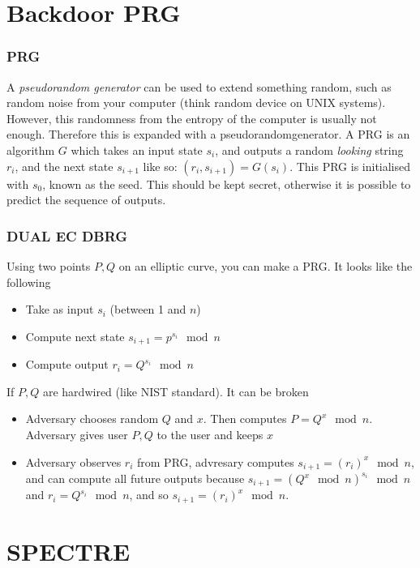 \section{Backdoor PRG}
\begin{frame}
    \frametitle{PRG}
        A \textit{pseudorandom generator} can be used to extend something random, such as random noise from your computer (think random device on UNIX systems). However, this randomness from the entropy of the computer is usually not enough. Therefore this is expanded with a pseudorandomgenerator. A PRG is an algorithm $G$ which takes an input state $s_i$, and outputs a random \textit{looking} string $r_i$, and the next state $s_{i + 1}$ like so: $(r_i, s_{i +1}) = G(s_i)$. This PRG is initialised with $s_0$, known as the seed. This should be kept secret, otherwise it is possible to predict the sequence of outputs. 
\end{frame}
    \begin{frame}
        \frametitle{DUAL EC DBRG}
            Using two points $P, Q$ on an elliptic curve, you can make a PRG. It looks like the following
            \begin{itemize}
                \item Take as input $s_i$ (between 1 and $n$)
                \item Compute next state $s_{i + 1} = p^{s_i} \mod n$
                \item Compute output $r_i = Q^{s_i} \mod n$
            \end{itemize}
            If $P, Q$ are hardwired (like NIST standard). It can be broken
            \begin{itemize}
                \item Adversary chooses random $Q$ and $x$. Then computes $P = Q^x \mod n$. Adversary gives user $P, Q$ to the user and keeps $x$
                \item Adversary observes $r_i$ from PRG, advresary computes $s_{i + 1} = (r_i)^x \mod n$, and can compute all future outputs because $s_{i + 1} = (Q^x \mod n)^{s_i} \mod n$ and $r_i = Q^{s_i} \mod n$, and so $s_{i + 1} = (r_i)^x \mod n$.  
            \end{itemize}
    \end{frame}


\section{SPECTRE}

